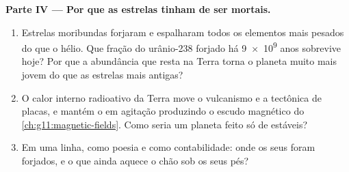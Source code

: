 \begin{problem}
\medskip
\noindent\textbf{Parte IV --- Por que as estrelas tinham de ser mortais.}
\begin{enumerate}[resume]
  \item Estrelas moribundas forjaram e espalharam todos os elementos mais
        pesados do que o hélio. Que fração do urânio-238 forjado há
        \num{9e9} anos sobrevive hoje? Por que a abundância que resta na
        Terra torna o planeta muito mais jovem do que as estrelas mais
        antigas?
  \item O calor interno radioativo da Terra move o vulcanismo e a
        tectônica de placas, e mantém o  em agitação produzindo o
        escudo magnético do \cref{ch:g11:magnetic-fields}. Como seria um
        planeta feito só de  estáveis?
  \item Em uma linha, como poesia e como contabilidade: onde os seus
         foram forjados, e o que ainda aquece o chão sob os seus
        pés?
\end{enumerate}
\end{problem}
